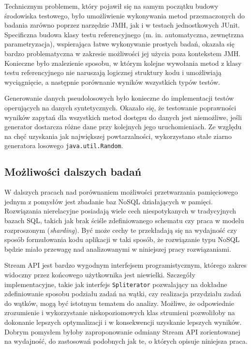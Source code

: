 \documentclass[12pt]{extarticle}
\begin{document}
    Technicznym problemem, który pojawił się na samym początku budowy środowiska testowego, było umożliwienie wykonywania metod przeznaczonych do badania zarówno poprzez narzędzie JMH, jak i w testach jednostkowych JUnit. Specificzna budowa klasy testu referencyjnego (m. in. automatyczna, zewnętrzna parametryzacja), wspierająca łatwe wykonywanie prostych badań, okazała się bardzo problematyczna w zakresie możliwości jej użycia poza kontekstem JMH. Konieczne było znalezienie sposobu, w którym kolejne wywołania metod z klasy testu referencyjnego nie naruszają logicznej struktury kodu i umożliwiają wyciągnięcie, a następnie porównanie wyników wszystkich typów testów.

    Generowanie danych pseudolosowych było konieczne do implementacji testów operujących na danych syntetycznych. Okazało się, że testowanie poprawności wyników zapytań dla wszystkich metod dostępu do danych jest niemożliwe, jeśli generator dostarcza różne dane przy kolejnych jego uruchomieniach. Ze względu na chęć uzyskania jak największej powtarzalności, wykorzystano stałe ziarno generatora losowego \texttt{java.util.Random}.

\subsection{Możliwości dalszych badań}

    W dalszych pracach nad porównaniem możliwości przetwarzania pamięciowego jednym z pomysłów jest zbadanie baz NoSQL działających w pamięci. Rozwiązania nierelacyjne posiadają wiele cech niespotykanych w tradycyjnych bazach SQL, takich jak brak ściśle zdefiniowanego schematu czy praca w modelu rozproszonym (\textit{sharding}). Być może cechy te przekładają się na wydajność czy sposób formułowania kodu aplikacji w taki sposób, że rozwiązanie typu NoSQL będzie miało przewagę nad analizowanymi w niniejszej pracy rozwiązaniami.

    Stream API jest bardzo wygodnym interfejsem programistycznym, którego zakres widoczny przez końcowego użytkownika jest niewielki. Szczegóły implementacyjne, takie jak interfejs \texttt{Spliterator} pozwalający na dokładne zdefiniowanie sposobu podziału zadań na wątki, czy realizacja przydziału zadań do wątków, mogą być istotnym tematem do analizy. Możliwe, że odpowiednie zrozumienie i wykorzystanie niskopoziomowych klas strumieni pozwoliłoby na dokonanie lepszych optymalizacji i w konsekwencji uzyskanie lepszych wyników. Dobrym pomysłem byłoby zaproponowanie odmiany Stream API zorientowanej na wydajność, do zastosowań podobnych jak te, o których opisuje niniejsza praca.
\end{document}

